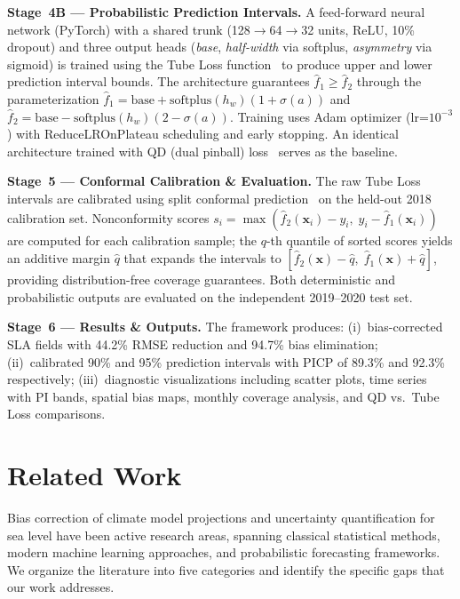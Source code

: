 \documentclass[conference]{IEEEtran}
\begin{document}
\textbf{Stage~4B --- Probabilistic Prediction Intervals.} A feed-forward neural network (PyTorch) with a shared trunk (128$\to$64$\to$32 units, ReLU, 10\% dropout) and three output heads (\emph{base}, \emph{half-width} via softplus, \emph{asymmetry} via sigmoid) is trained using the Tube Loss function~\cite{anand2024} to produce upper and lower prediction interval bounds. The architecture guarantees $\hat{f}_1 \geq \hat{f}_2$ through the parameterization $\hat{f}_1 = \text{base} + \text{softplus}(h_w)(1+\sigma(a))$ and $\hat{f}_2 = \text{base} - \text{softplus}(h_w)(2-\sigma(a))$. Training uses Adam optimizer (lr=$10^{-3}$) with ReduceLROnPlateau scheduling and early stopping. An identical architecture trained with QD (dual pinball) loss~\cite{pearce2018} serves as the baseline.

\textbf{Stage~5 --- Conformal Calibration \& Evaluation.} The raw Tube Loss intervals are calibrated using split conformal prediction~\cite{vovk2005} on the held-out 2018 calibration set. Nonconformity scores $s_i = \max(\hat{f}_2(\mathbf{x}_i) - y_i, \; y_i - \hat{f}_1(\mathbf{x}_i))$ are computed for each calibration sample; the $q$-th quantile of sorted scores yields an additive margin $\hat{q}$ that expands the intervals to $[\hat{f}_2(\mathbf{x}) - \hat{q}, \; \hat{f}_1(\mathbf{x}) + \hat{q}]$, providing distribution-free coverage guarantees. Both deterministic and probabilistic outputs are evaluated on the independent 2019--2020 test set.

\textbf{Stage~6 --- Results \& Outputs.} The framework produces: (i)~bias-corrected SLA fields with 44.2\% RMSE reduction and 94.7\% bias elimination; (ii)~calibrated 90\% and 95\% prediction intervals with PICP of 89.3\% and 92.3\% respectively; (iii)~diagnostic visualizations including scatter plots, time series with PI bands, spatial bias maps, monthly coverage analysis, and QD vs.\ Tube Loss comparisons.

\section{Related Work}

Bias correction of climate model projections and uncertainty quantification for sea level have been active research areas, spanning classical statistical methods, modern machine learning approaches, and probabilistic forecasting frameworks. We organize the literature into five categories and identify the specific gaps that our work addresses.
\end{document}
